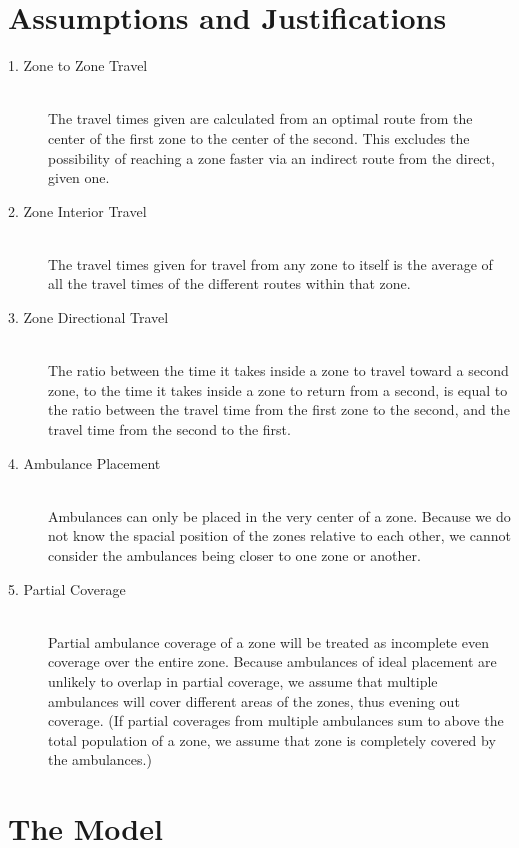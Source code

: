 \documentclass[notitlepage, 12pt]{article}
\begin{document}
\section{Assumptions and Justifications}
\begin{description}
    \item[1. Zone to Zone Travel] \hfill \\
    	The travel times given are calculated from an optimal route from the center of the first
        zone to the center of the second. This excludes the possibility of reaching a zone faster
        via an indirect route from the direct, given one.
    \item[2. Zone Interior Travel] \hfill \\
    	The travel times given for travel from any zone to itself is the average
        of all the travel times of the different routes within that zone.
    \item[3. Zone Directional Travel] \hfill \\
    	The ratio between the time it takes inside a zone to travel toward a second zone,
        to the time it takes inside a zone to return from a second, is equal to the ratio
        between the travel time from the first zone to the second, and the travel time from the
        second to the first.
    \item[4. Ambulance Placement] \hfill \\
        Ambulances can only be placed in the very center of a zone. Because we do not know the
        spacial position of the zones relative to each other, we cannot consider the ambulances
        being closer to one zone or another.
    \item[5. Partial Coverage] \hfill \\
        Partial ambulance coverage of a zone will be treated as incomplete even coverage over the entire
        zone. Because ambulances of ideal placement are unlikely to overlap in partial coverage, we assume
        that multiple ambulances will cover different areas of the zones, thus evening out coverage. (If partial coverages from multiple ambulances sum to above the total population of a zone,
        we assume that zone is completely covered by the ambulances.)
\end{description}

\section{The Model}
\end{document}
